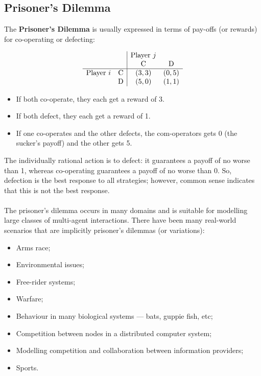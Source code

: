 \documentclass[a4paper,11pt]{article}
\begin{document}
\subsection{Prisoner's Dilemma}
The \textbf{Prisoner's Dilemma} is usually expressed in terms of pay-offs (or rewards) for co-operating or defecting:

\[
\begin{array}{c c|c c}
  & & \text{Player } j & \\
  & & \text{C} & \text{D} \\
\hline
  \text{Player } i & \text{C} & (3, 3) & (0, 5) \\
                  & \text{D} & (5, 0) & (1, 1)
\end{array}
\]

\begin{itemize}
    \item   If both co-operate, they each get a reward of 3.
    \item   If both defect, they each get a reward of 1.
    \item   If one co-operates and the other defects, the com-operators gets 0 (the sucker's payoff) and the other gets 5.
\end{itemize}

The individually rational action is to defect:
it guarantees a payoff of no worse than 1, whereas co-operating guarantees a payoff of no worse than 0.
So, defection is the best response to all strategies;
however, common sense indicates that this is not the best response.
\\\\
The prisoner's dilemma occurs in many domains and is suitable for modelling large classes of multi-agent interactions.
There have been many real-world scenarios that are implicitly prisoner's dilemmas (or variations):
\begin{itemize}
    \item   Arms race;
    \item   Environmental issues;
    \item   Free-rider systems;
    \item   Warfare;
    \item   Behaviour in many biological systems --- bats, guppie fish, etc;
    \item   Competition between nodes in a distributed computer system;
    \item   Modelling competition and collaboration between information providers;
    \item   Sports.
\end{itemize}
\end{document}
